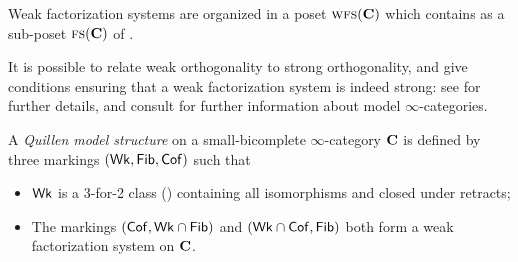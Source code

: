 Weak factorization systems are organized in a poset $\text{\scshape wfs}(\mathbf{C})$ which contains as a sub\hyp{}poset $\text{\scshape fs}(\mathbf{C})$ of \adef {}.

It is possible to relate weak orthogonality to strong orthogonality, and give conditions ensuring that a weak factorization system is indeed strong: see \cite[\S\textbf{1}]{RT} for further details, and consult \cite{Aaron} for further information about model $\infty$\hyp{}categories.
\begin{example}\label{df:infty.model.cat}
A \emph{Quillen model structure} on a small\hyp{}bicomplete $\infty$\hyp{}category $\mathbf{C}$ is defined by three markings $(\mathsf{Wk},\mathsf{Fib},\mathsf{Cof})$ such that
\begin{itemize}
\item $\mathsf{Wk}$ is a 3\hyp{}for\hyp{}2 class (\adef {}) containing all isomorphisms and closed under retracts;
\item The markings $(\mathsf{Cof},\mathsf{Wk}\cap \mathsf{Fib})$ and $(\mathsf{Wk}\cap \mathsf{Cof},\mathsf{Fib})$ both form a weak factorization system on $\mathbf{C}$.
\end{itemize}
\end{example}
